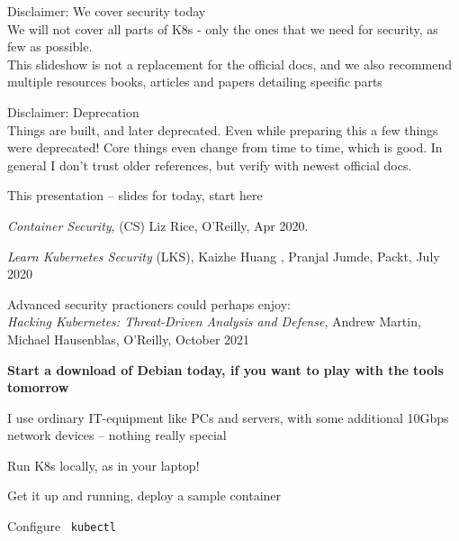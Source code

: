\documentclass[Screen16to9,17pt]{foils}
\begin{document}

\begin{list2}
\item Disclaimer: We cover security today\\
We will not cover all parts of K8s  - only the ones that we need for security, as few as possible.\\
This slideshow is not a replacement for the official docs, and we also recommend multiple resources books, articles and papers detailing specific parts

\item Disclaimer: Deprecation\\
Things are built, and later deprecated. Even while preparing this a few things were deprecated! Core things even change from time to time, which is good. In general I don't trust older references, but verify with newest official docs.
\end{list2}


\begin{list2}
\item This presentation -- slides for today, start here
\item \emph{Container Security}, (CS) Liz Rice, O'Reilly, Apr 2020.
\item \emph{Learn Kubernetes Security} (LKS), Kaizhe Huang , Pranjal Jumde, Packt, July 2020
\item Advanced security practioners could perhaps enjoy:\\
\emph{Hacking Kubernetes: Threat-Driven Analysis and Defense}, Andrew Martin, Michael Hausenblas, O'Reilly, October 2021
\end{list2}


{\bf Start a download of Debian today, if you want to play with the tools tomorrow}

I use ordinary IT-equipment like PCs and servers, with some additional 10Gbps network devices -- nothing really special





\begin{list2}
\item Run K8s locally, as in your laptop!
\item Get it up and running, deploy a sample container
\item Configure \faWrench\ \verb+kubectl+
\end{list2}
\end{document}
